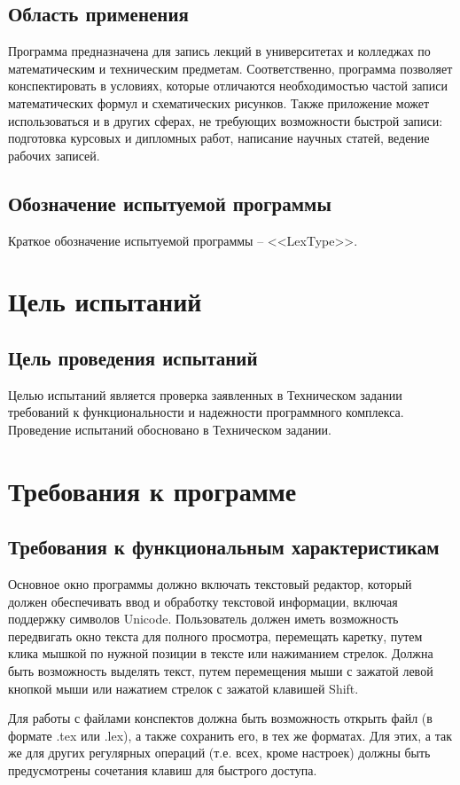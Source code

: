 \documentclass[testmethods]{espd}
\begin{document}
\subsection{Область применения}
Программа предназначена для запись лекций в университетах и колледжах по математическим и техническим предметам. Соответственно, программа позволяет конспектировать в условиях, которые отличаются необходимостью частой записи математических формул и схематических рисунков. Также приложение может использоваться и в других сферах, не требующих возможности быстрой записи: подготовка курсовых и дипломных работ, написание научных статей, ведение рабочих записей.

\subsection{Обозначение испытуемой программы}
Краткое обозначение испытуемой программы -- <<LexType>>.

\section{Цель испытаний}
\subsection{Цель проведения испытаний}
Целью испытаний является проверка заявленных в Техническом задании требований к функциональности и надежности программного комплекса. Проведение испытаний обосновано в Техническом задании.

\section{Требования к программе}
\subsection{Требования к функциональным характеристикам}
Основное окно программы должно включать текстовый редактор, который должен обеспечивать ввод и обработку текстовой информации, включая поддержку символов Unicode. Пользователь должен иметь возможность передвигать окно текста для полного просмотра, перемещать каретку, путем клика мышкой по нужной позиции в тексте или нажиманием стрелок. Должна быть возможность выделять текст, путем перемещения мыши с зажатой левой кнопкой мыши или нажатием стрелок с зажатой клавишей Shift.

Для работы с файлами конспектов должна быть возможность открыть файл (в формате .tex или .lex), а также сохранить его, в тех же форматах. Для этих, а так же для других регулярных операций (т.е. всех, кроме настроек) должны быть предусмотрены сочетания клавиш для быстрого доступа.
\end{document}
